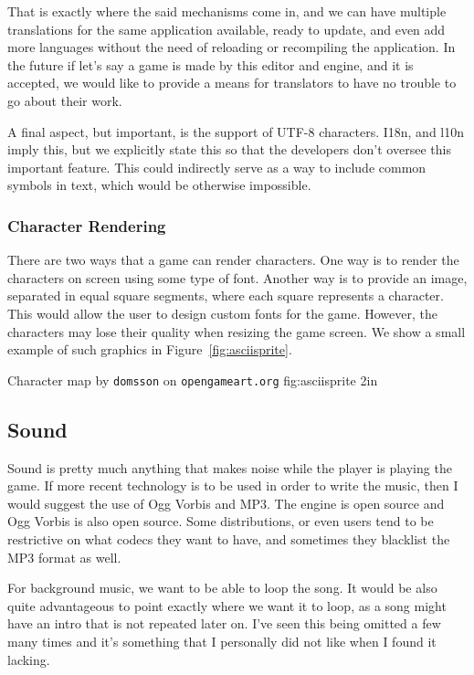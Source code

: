 That is exactly where the said mechanisms come in, and we can have multiple
translations for the same application available, ready to update, and even add
more languages without the need of reloading or recompiling the application. In
the future if let's say a game is made by this editor and engine, and it is
accepted, we would like to provide a means for translators to have no trouble to
go about their work.

A final aspect, but important, is the support of UTF-8 characters. I18n, and
l10n imply this, but we explicitly state this so that the developers don't
oversee this important feature. This could indirectly serve as a way to include
common symbols in text, which would be otherwise impossible.

\subsubsection{Character Rendering}

There are two ways that a game can render characters. One way is to render the
characters on screen using some type of font. Another way is to provide an
image, separated in equal square segments, where each square represents a
character. This would allow the user to design custom fonts for the game.
However, the characters may lose their quality when resizing the game screen.
We show a small example of such graphics in Figure~\ref{fig:asciisprite}.

%
       {Character map by \texttt{domsson} on \texttt{opengameart.org} \cite{donssonascii}}%
       {fig:asciisprite}%
       {2in}

\subsection{Sound}

Sound is pretty much anything that makes noise while the player is playing the
game. If more recent technology is to be used in order to write the music, then
I would suggest the use of Ogg Vorbis and MP3. The engine is open source and Ogg
Vorbis is also open source. Some distributions, or even users tend to be
restrictive on what codecs they want to have, and sometimes they blacklist the
MP3 format as well.

For background music, we want to be able to loop the song. It would be also
quite advantageous to point exactly where we want it to loop, as a song might
have an intro that is not repeated later on. I've seen this being omitted a few
many times and it's something that I personally did not like when I found it
lacking.

